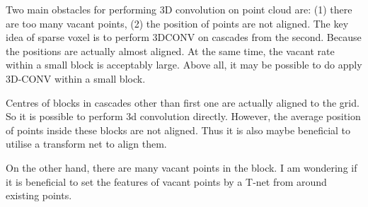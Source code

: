 \documentclass[,table,dvipsnames]{article}
\begin{document}
\par \par
Two main obstacles for performing 3D convolution on point cloud are: (1) there are too many vacant points, (2) the position of points are not aligned.
The key idea of sparse voxel is to perform 3DCONV on cascades from the second. Because the positions are actually almost aligned. At the same time, the vacant rate within a small block is acceptably large. Above all, it may be possible to do apply 3D-CONV within a small block. 
\par
Centres of blocks in cascades other than first one are actually aligned to the grid. So it is possible to perform 3d convolution directly. However, the average position of points inside these blocks are not aligned. Thus it is also maybe beneficial to utilise a transform net to align them.\par
On the other hand, there are many vacant points in the block. I am wondering if it is beneficial to set the features of vacant points by a T-net from around existing points.
\par
\end{document}
